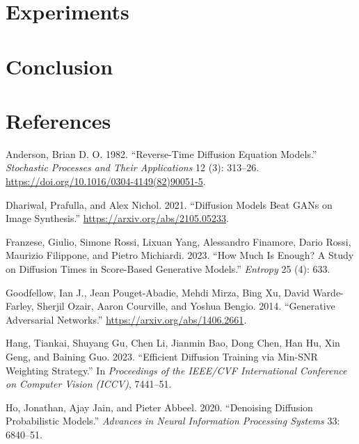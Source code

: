 \documentclass[
]{article}
\newlength{\cslhangindent}
\newenvironment{CSLReferences}[2] %
 {\begin{list}{}{%
  \setlength{\itemindent}{0pt}
  \setlength{\leftmargin}{0pt}
  \setlength{\parsep}{0pt}
  \ifodd #1
   \setlength{\leftmargin}{\cslhangindent}
   \setlength{\itemindent}{-1\cslhangindent}
  \fi
  \setlength{\itemsep}{#2\baselineskip}}}
 {\end{list}}
\theoremstyle{remark}
\begin{document}
\section{Experiments}\label{experiments}

\section{Conclusion}\label{conclusion}

\newpage{}

\section*{References}\label{references}

\label{refs}
\begin{CSLReferences}{1}{0}
Anderson, Brian D. O. 1982. {``Reverse-Time Diffusion Equation
Models.''} \emph{Stochastic Processes and Their Applications} 12 (3):
313--26. \url{https://doi.org/10.1016/0304-4149(82)90051-5}.

Dhariwal, Prafulla, and Alex Nichol. 2021. {``Diffusion Models Beat GANs
on Image Synthesis.''} \url{https://arxiv.org/abs/2105.05233}.

Franzese, Giulio, Simone Rossi, Lixuan Yang, Alessandro Finamore, Dario
Rossi, Maurizio Filippone, and Pietro Michiardi. 2023. {``How Much Is
Enough? A Study on Diffusion Times in Score-Based Generative Models.''}
\emph{Entropy} 25 (4): 633.

Goodfellow, Ian J., Jean Pouget-Abadie, Mehdi Mirza, Bing Xu, David
Warde-Farley, Sherjil Ozair, Aaron Courville, and Yoshua Bengio. 2014.
{``Generative Adversarial Networks.''}
\url{https://arxiv.org/abs/1406.2661}.

Hang, Tiankai, Shuyang Gu, Chen Li, Jianmin Bao, Dong Chen, Han Hu, Xin
Geng, and Baining Guo. 2023. {``Efficient Diffusion Training via Min-SNR
Weighting Strategy.''} In \emph{Proceedings of the IEEE/CVF
International Conference on Computer Vision (ICCV)}, 7441--51.

Ho, Jonathan, Ajay Jain, and Pieter Abbeel. 2020. {``Denoising Diffusion
Probabilistic Models.''} \emph{Advances in Neural Information Processing
Systems} 33: 6840--51.


\end{CSLReferences}
\end{document}
